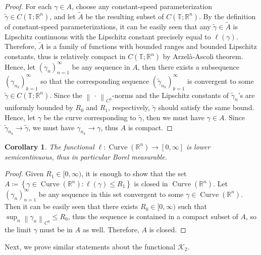 \documentclass[reqno,centertags,12pt]{amsart}
\newtheorem{corollary}[theorem]{Corollary}
\theoremstyle{definition}
\numberwithin{equation}{section}
\newcommand{\norm}[1]{\left\|#1\right\|}
\newcommand{\setbc}[2]{\left\{ #1\colon#2 \right\}}
\newcommand{\seq}[1]{\left( #1 \right)}
\newcommand{\bbR}{{\mathbb{R}}}
\newcommand{\bbT}{{\mathbb{T}}}
\begin{document}
\begin{proof}
    For each $\gamma\in A$, choose any constant-speed parameterization
    $\tilde{\gamma}\in C(\bbT;\bbR^{n})$, and let $\tilde{A}$ be the resulting
    subset of $C(\bbT;\bbR^{n})$. By the definition of constant-speed parameterizations,
    it can be easily seen that any $\tilde{\gamma}\in\tilde{A}$ is Lipschitz continuous
    with the Lipschitz constant precisely equal to $\ell(\gamma)$.
    Therefore, $\tilde{A}$ is a family of functions with bounded ranges and
    bounded Lipschitz constants, thus is relatively compact in $C(\bbT;\bbR^{n})$
    by Arzel\`{a}-Ascoli theorem. Hence, let $\seq{\gamma_{n}}_{n=1}^{\infty}$
    be any sequence in $A$, then there exists a subsequence
    $\seq{\gamma_{n_{k}}}_{k=1}^{\infty}$ so that the corresponding sequence
    $\seq{\tilde{\gamma}_{n_{k}}}_{k=1}^{\infty}$ is convergent to some
    $\tilde{\gamma} \in C(\bbT;\bbR^{n})$.
    Since the $\norm{\,\cdot\,}_{C^{0}}$-norms and the Lipschitz constants of
    $\tilde{\gamma}_{n}$'s are uniformly bounded by $R_{0}$ and $R_{1}$, respectively,
    $\tilde{\gamma}$ should satisfy the same bound. Hence, let $\gamma$ be the curve
    corresponding to $\tilde{\gamma}$, then we must have $\gamma\in A$.
    Since $\tilde{\gamma}_{n_{k}}\to\tilde{\gamma}$, we must have
    $\gamma_{n_{k}}\to\gamma$, thus $A$ is compact.
\end{proof}

\begin{corollary}\label{CB.2}
    The functional $\ell\colon\operatorname{Curve}(\bbR^{n})\to[0,\infty]$
    is lower semicontinuous, thus in particular Borel measurable.
\end{corollary}

\begin{proof}
    Given $R_{1}\in[0,\infty)$, it is enough to show that the set
    $A\coloneqq \setbc{\gamma\in\operatorname{Curve}(\bbR^{n})}{\ell(\gamma)\leq R_{1}}$
    is closed in $\operatorname{Curve}(\bbR^{n})$. Let $\seq{\gamma_{n}}_{n=1}^{\infty}$
    be any sequence in this set convergent to some $\gamma\in\operatorname{Curve}(\bbR^{n})$.
    Then it can be easily seen that there exists $R_{0}\in[0,\infty)$ such that
    $\sup_{n}\norm{\gamma_{n}}_{C^{0}}\leq R_{0}$, thus the sequence is contained in a
    compact subset of $A$, so the limit $\gamma$ must be in $A$ as well.
    Therefore, $A$ is closed.
\end{proof}

Next, we prove similar statements about the functional $\mathcal{K}_{2}$.
\end{document}
